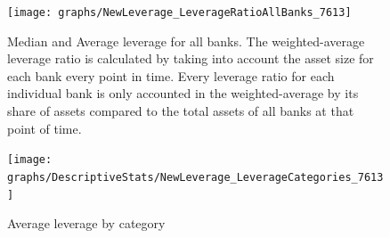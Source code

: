 \documentclass[12pt, a4paper]{article} %
\begin{document}
\begin{figure}[H]
\begin{minipage}{\textwidth}
\centering
\texttt{[image: graphs/NewLeverage\_LeverageRatioAllBanks\_7613]}
\caption[1]{Median and Average leverage for all banks. The weighted-average leverage ratio is calculated by taking into account the asset size for each bank every point in time. Every leverage ratio for each individual bank is only accounted in the weighted-average by its share of assets compared to the total assets of all banks at that point of time.}
\label{fig:averageLeverage}
\end{minipage}
\end{figure}

\begin{figure}[H]
\begin{minipage}{\textwidth}
\centering
\texttt{[image: graphs/DescriptiveStats/NewLeverage\_LeverageCategories\_7613]}
\caption[1]{Average leverage by category}
\label{fig:averageLeverage_Categories}
\end{minipage}
\end{figure}
\end{document}
